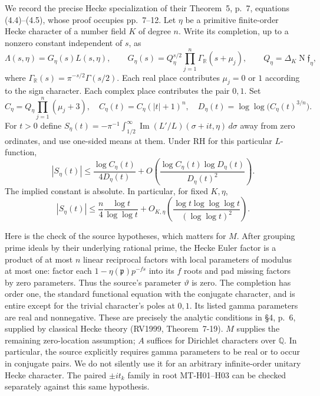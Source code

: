 We record the precise Hecke specialization of their Theorem~5,
p.~7, equations (4.4)--(4.5), whose proof occupies pp.~7--12.
Let $\eta$ be a primitive finite-order Hecke character of a number
field $K$ of degree $n$.  Write its completion, up to a nonzero
constant independent of $s$, as
\[
 \Lambda(s,\eta)=G_\eta(s)L(s,\eta),\qquad
 G_\eta(s)=Q_\eta^{s/2}\prod_{j=1}^n\Gamma_{\mathbb R}(s+\mu_j),
 \qquad Q_\eta=\Delta_K\operatorname N\mathfrak f_\eta,
\]
where $\Gamma_{\mathbb R}(s)=\pi^{-s/2}\Gamma(s/2)$.
Each real place contributes $\mu_j=0$ or $1$ according to the sign
character.  Each complex place contributes the pair $0,1$.
Set
\[
 C_\eta=Q_\eta\prod_{j=1}^n(\mu_j+3),\quad
 C_\eta(t)=C_\eta(|t|+1)^n,\quad
 D_\eta(t)=\log\log\bigl(C_\eta(t)^{3/n}\bigr).
\]
For $t>0$ define
$S_\eta(t)=-\pi^{-1}\int_{1/2}^{\infty}
\operatorname{Im}(L'/L)(\sigma+it,\eta)\,d\sigma$ away from zero
ordinates, and use one-sided means at them.  Under RH for this
particular $L$-function,
\[
 |S_\eta(t)|\le\frac{\log C_\eta(t)}{4D_\eta(t)}
   +O\left(\frac{\log C_\eta(t)\log D_\eta(t)}{D_\eta(t)^2}\right).
\tag{NT-Z13b}
\]
The implied constant is absolute.  In particular, for fixed $K,\eta$,
\[
 |S_\eta(t)|\le\frac n4\frac{\log t}{\log\log t}
   +O_{K,\eta}\left(
       \frac{\log t\log\log\log t}{(\log\log t)^2}\right).
\tag{NT-Z13c}
\]

Here is the check of the source hypotheses, which matters for $M$.
After grouping prime ideals by their underlying rational prime, the
Hecke Euler factor is a product of at most $n$ linear reciprocal
factors with local parameters of modulus at most one: factor each
$1-\eta(\mathfrak p)p^{-fs}$ into its $f$ roots and pad missing
factors by zero parameters.  Thus the source's parameter $\vartheta$
is zero.  The completion has order one, the standard functional
equation with the conjugate character, and is entire except for the
trivial character's poles at $0,1$.  Its listed gamma parameters are
real and nonnegative.  These are precisely the analytic conditions
in \S4, p.~6, supplied by classical Hecke theory (RV1999,
Theorem~7-19).  $M$ supplies the remaining zero-location assumption;
$A$ suffices for Dirichlet characters over $\mathbb Q$.
In particular, the source explicitly requires gamma parameters to be
real or to occur in conjugate pairs.  We do not silently use it for
an arbitrary infinite-order unitary Hecke character.  The paired
$\pm it_k$ family in root MT-H01--H03 can be checked separately
against this same hypothesis.

